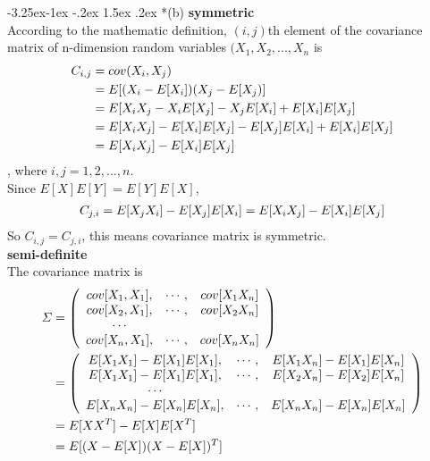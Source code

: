 \documentclass[12pt]{article}
\makeatletter
\renewcommand\subsection{\@startsection{subsection}{2}{\z@}%
	{-3.25ex\@plus -1ex \@minus -.2ex}%
	{1.5ex \@plus .2ex}%
	{\normalfont\large\bfseries}}%
\makeatother
\begin{document}
	\subsection*{(b)}
	\textbf{symmetric}\\
	According to the mathematic definition, $(i,j)$th element of the covariance matrix of n-dimension random variables $(X_1, X_2, ... , X_n$ is 
	\begin{equation}{\label{cov_ij}}
	\begin{aligned}
		C_{i,j}
		&=cov(X_i,X_j)\\
		&=E[(X_i-E[X_i])(X_j-E[X_j)]\\
		&=E[X_iX_j-X_iE[X_j]-X_jE[X_i]+E[X_i]E[X_j]\\
		&=E[X_iX_j]-E[X_i]E[X_j]-E[X_j]E[X_i]+E[X_i]E[X_j]\\
		&=E[X_iX_j]-E[X_i]E[X_j]
	\end{aligned}
	\end{equation}
	\noindent
	, where $i,j=1,2, ... ,n$.\\
	Since $E[X]E[Y]=E[Y]E[X]$,
	\begin{equation}{\label{cov_ji}}
	\begin{aligned}
		C_{j,i}=E[X_jX_i]-E[X_j]E[X_i]=E[X_iX_j]-E[X_i]E[X_j]
	\end{aligned}
	\end{equation}
	So $C_{i,j} = C_{j,i}$, this means covariance matrix is symmetric.\\
	\textbf{semi-definite}\\
	The covariance matrix is
	\begin{equation}{\label{cov_full}}
	\begin{aligned}
		\varSigma &= 
		\left(
		\begin{array}{ccc}
			cov[X_1,X_1], &\cdots, &cov[X_1X_n]\\
			cov[X_2,X_1], &\cdots, &cov[X_2X_n]\\
			\cdots\\
			cov[X_n,X_1], &\cdots, &cov[X_nX_n]\\
		\end{array}
		\right)\\
		&= 
		\left(
		\begin{array}{ccc}
			E[X_1X_1]-E[X_1]E[X_1], &\cdots, &E[X_1X_n]-E[X_1]E[X_n]\\
			E[X_1X_1]-E[X_1]E[X_1], &\cdots, &E[X_2X_n]-E[X_2]E[X_n]\\
			\cdots\\
			E[X_nX_n]-E[X_n]E[X_n], &\cdots, &E[X_nX_n]-E[X_n]E[X_n]\\
		\end{array}
		\right)\\
		&=E[XX^T]-E[X]E[X^T]\\
		&=E[(X-E[X])(X-E[X])^T]
	\end{aligned}
	\end{equation}
	
\end{document}
